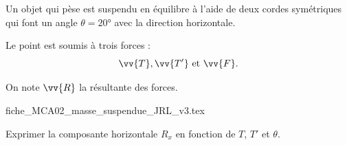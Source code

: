                                 \initialisationPartieGauche %
Un objet qui pèse  est suspendu en équilibre à l'aide de deux cordes symétriques qui font un angle $\theta=\ang{20}$ avec la direction horizontale. 

Le point \ptA est soumis à trois forces : 
\[
\vv{T}, \vv{T'}\text{ et }\vv{F}.
\] 

On note $\vv{R}$ la résultante des forces.
                                \initialisationPartieDroite %
\begin{center}
{fiche_MCA02_masse_suspendue_JRL_v3.tex}
\end{center}
                               \finalisationDuPartageDePage %



\debutEntrainement


\begin{enonce}
	 Exprimer la composante horizontale $R_x$ en fonction de $T$, $T'$ et $\theta$.
\end{enonce}


